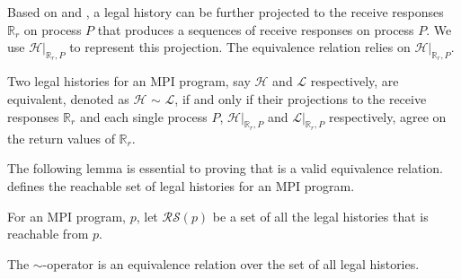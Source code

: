 Based on  and , a legal history can be further projected to the receive responses $\mathbb{R}_r$ on process $P$ that produces a sequences of receive responses on process $P$. We use $\mathcal{H} | _{\mathbb{R}_r,P}$ to represent this projection. The equivalence relation relies on $\mathcal{H} | _{\mathbb{R}_r,P}$.

\begin{definition}\label{def:er}
Two legal histories for an MPI program, say $\mathcal{H}$ and $\mathcal{L}$ respectively, are equivalent, denoted as $\mathcal{H}$ $\sim$ $\mathcal{L}$, if and only if their projections to the receive responses $\mathbb{R}_r$ and each single process $P$, $\mathcal{H} | _{\mathbb{R}_r,P}$ and $\mathcal{L} | _{\mathbb{R}_r,P}$ respectively, agree on the return values of $\mathbb{R}_r$.
\end{definition}

The following lemma is essential to proving that  is a valid equivalence relation.  defines the reachable set of legal histories for an MPI program. 

\begin{definition}\label{def:reachable}
For an MPI program, $\mathit{p}$, let $\mathcal{RS}(\mathit{p})$ be a set of all the legal histories that is reachable from $\mathit{p}$.
\end{definition}

\begin{lemma}\label{lemma:rst}
The $\sim$-operator is an equivalence relation over the set of all legal histories.
\end{lemma}

